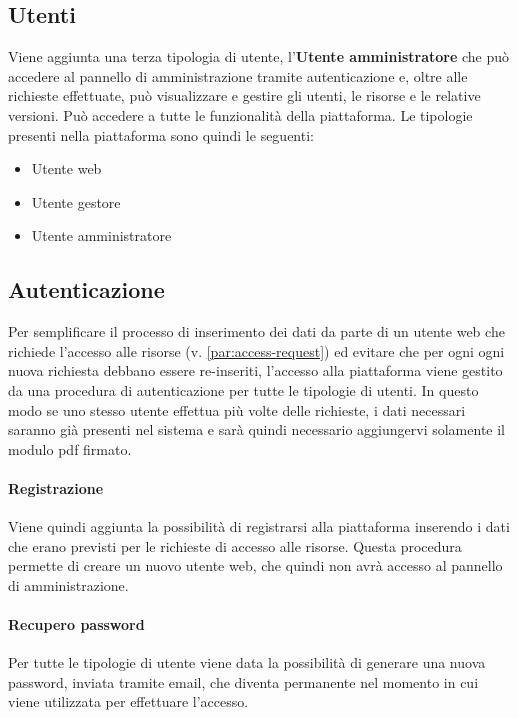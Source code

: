 \subsection{Utenti}
Viene aggiunta una terza tipologia di utente, l'\textbf{Utente amministratore}
che può accedere al pannello di amministrazione tramite autenticazione e, oltre
alle richieste effettuate, può visualizzare e gestire gli utenti, le risorse e
le relative versioni. Può accedere a tutte le funzionalità della piattaforma.
Le tipologie presenti nella piattaforma sono quindi le seguenti:
\begin{itemize}
	\item Utente web
	\item Utente gestore
	\item Utente amministratore
\end{itemize}


\subsection{Autenticazione} \label{subsec:authentication}
Per semplificare il processo di inserimento dei dati da parte di un utente web
che richiede l'accesso alle risorse (v. \ref{par:access-request}) ed evitare che
per ogni ogni nuova richiesta debbano essere re-inseriti, l'accesso alla piattaforma
viene gestito da una procedura di autenticazione per tutte le tipologie di utenti.
In questo modo se uno stesso utente effettua più volte delle richieste, i dati
necessari saranno già presenti nel sistema e sarà quindi necessario aggiungervi
solamente il modulo pdf firmato.

\paragraph{Registrazione}
Viene quindi aggiunta la possibilità di registrarsi alla piattaforma inserendo i
dati che erano previsti per le richieste di accesso alle risorse. Questa procedura
permette di creare un nuovo utente web, che quindi non avrà accesso al pannello
di amministrazione.

\paragraph{Recupero password}
Per tutte le tipologie di utente viene data la possibilità di generare una nuova
password, inviata tramite email, che diventa permanente nel momento in cui
viene utilizzata per effettuare l'accesso.

